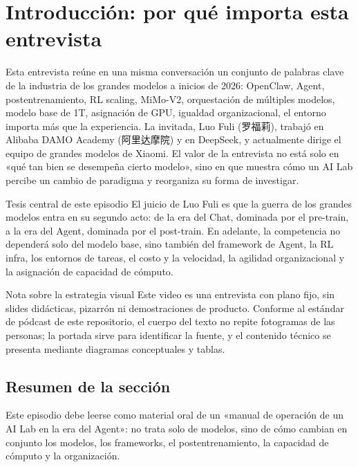 \section{Introducción: por qué importa esta entrevista}

Esta entrevista reúne en una misma conversación un conjunto de palabras clave de la industria de los grandes modelos a inicios de 2026: OpenClaw, Agent, postentrenamiento, RL scaling, MiMo-V2, orquestación de múltiples modelos, modelo base de 1T, asignación de GPU, igualdad organizacional, el entorno importa más que la experiencia. La invitada, Luo Fuli (罗福莉), trabajó en Alibaba DAMO Academy (阿里达摩院) y en DeepSeek, y actualmente dirige el equipo de grandes modelos de Xiaomi. El valor de la entrevista no está solo en «qué tan bien se desempeña cierto modelo», sino en que muestra cómo un AI Lab percibe un cambio de paradigma y reorganiza su forma de investigar.

\begin{importantbox}{Tesis central de este episodio}
El juicio de Luo Fuli es que la guerra de los grandes modelos entra en su segundo acto: de la era del Chat, dominada por el pre-train, a la era del Agent, dominada por el post-train. En adelante, la competencia no dependerá solo del modelo base, sino también del framework de Agent, la RL infra, los entornos de tareas, el costo y la velocidad, la agilidad organizacional y la asignación de capacidad de cómputo.
\end{importantbox}

\begin{knowledgebox}{Nota sobre la estrategia visual}
Este video es una entrevista con plano fijo, sin slides didácticas, pizarrón ni demostraciones de producto. Conforme al estándar de pódcast de este repositorio, el cuerpo del texto no repite fotogramas de las personas; la portada sirve para identificar la fuente, y el contenido técnico se presenta mediante diagramas conceptuales y tablas.
\end{knowledgebox}

\subsection{Resumen de la sección}

Este episodio debe leerse como material oral de un «manual de operación de un AI Lab en la era del Agent»: no trata solo de modelos, sino de cómo cambian en conjunto los modelos, los frameworks, el postentrenamiento, la capacidad de cómputo y la organización.
